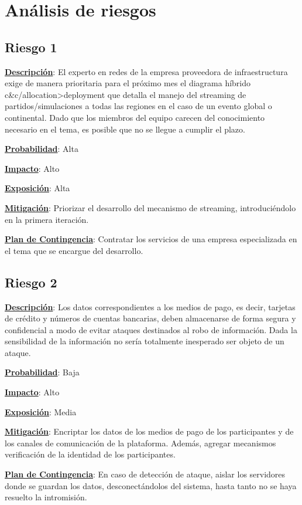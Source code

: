 \section{Análisis de riesgos}
\label{sec:riesgos}
\subsection*{Riesgo 1}
\textbf{\underline{Descripción}}: El experto en redes de la empresa proveedora de infraestructura exige de manera prioritaria para el próximo mes el diagrama híbrido  c\&c/allocation>deployment
que detalla el manejo del streaming de partidos/simulaciones a todas las regiones en el caso de un evento global o continental. Dado que los miembros del equipo carecen del conocimiento necesario en el tema, es posible que no se llegue a cumplir el plazo.

\textbf{\underline{Probabilidad}}: Alta

\textbf{\underline{Impacto}}: Alto

\textbf{\underline{Exposición}}: Alta

\textbf{\underline{Mitigación}}: Priorizar el desarrollo del mecanismo de streaming, introduciéndolo en la primera iteración.

\textbf{\underline{Plan de Contingencia}}: Contratar los servicios de una empresa especializada en el tema
que se encargue del desarrollo.

\subsection*{Riesgo 2}
\textbf{\underline{Descripción}}: Los datos correspondientes a los medios de pago, es decir, tarjetas de crédito
y números de cuentas bancarias, deben almacenarse de forma segura y confidencial a modo de evitar ataques destinados al robo de información. Dada la sensibilidad de la información no sería totalmente inesperado ser objeto de un ataque.

\textbf{\underline{Probabilidad}}: Baja

\textbf{\underline{Impacto}}: Alto

\textbf{\underline{Exposición}}: Media

\textbf{\underline{Mitigación}}: Encriptar los datos de los medios de pago de los participantes y de los canales de comunicación de la plataforma. Además, agregar mecanismos verificación de la identidad de los participantes.

\textbf{\underline{Plan de Contingencia}}: En caso de detección de ataque, aislar los servidores donde se guardan los datos, desconectándolos del sistema, hasta tanto no se haya resuelto la intromisión.


